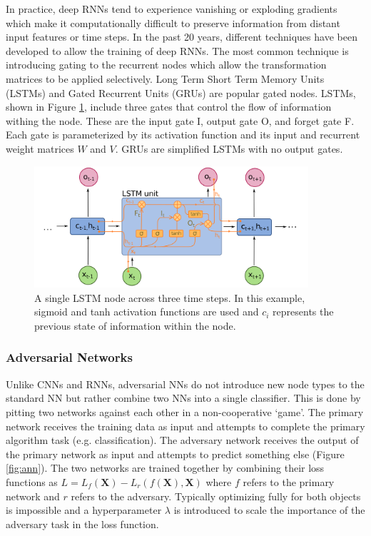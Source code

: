 In practice, deep RNNs tend to experience vanishing or exploding gradients which make it computationally difficult to preserve information from distant input features or time steps. In the past 20 years, different techniques have been developed to allow the training of deep RNNs. The most common technique is introducing gating to the recurrent nodes which allow the transformation matrices to be applied selectively. Long Term Short Term Memory Units (LSTMs) and Gated Recurrent Units (GRUs) are popular gated nodes. LSTMs, shown in Figure \ref{fig:lstm}, include three gates that control the flow of information withing the node. These are the input gate I, output gate O, and forget gate F. Each gate is parameterized by its activation function and its input and recurrent weight matrices $W$ and $V$. GRUs are simplified LSTMs with no output gates.\\

\begin{figure}[htb!]
    \centering
    \includegraphics[width=4in]{figures/chapter4/lstm.png}
    \caption{A single LSTM node across three time steps. In this example, sigmoid and tanh activation functions are used and $c_i$ represents the previous state of information within the node.}
    \label{fig:lstm}
\end{figure}

\subsubsection{Adversarial Networks}
Unlike CNNs and RNNs, adversarial NNs do not introduce new node types to the standard NN but rather combine two NNs into a single classifier. This is done by pitting two networks against each other in a non-cooperative `game'. The primary network receives the training data as input and attempts to complete the primary algorithm task (e.g. classification). The adversary network receives the output of the primary network as input and attempts to predict something else (Figure \ref{fig:ann}). The two networks are trained together by combining their loss functions as $L=L_f(\mathbf{X})-L_r(f(\mathbf{X}),\mathbf{X})$ where $f$ refers to the primary network and $r$ refers to the adversary. Typically optimizing fully for both objects is impossible and a hyperparameter $\lambda$ is introduced to scale the importance of the adversary task in the loss function. 

